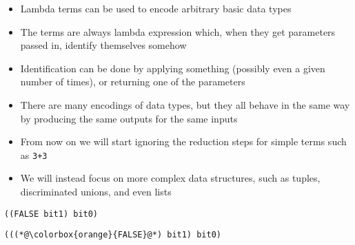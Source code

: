 \documentclass{beamer}
\begin{document}
\begin{frame}[fragile]{\CurrentSection}
\begin{block}{\CurrentSubSection}
\begin{itemize}
\item Lambda terms can be used to encode arbitrary basic data types
\item The terms are always lambda expression which, when they get parameters passed in, identify themselves somehow
\item Identification can be done by applying something (possibly even a given number of times), or returning one of the parameters

\end{itemize}

\end{block}


\end{frame}

\begin{frame}[fragile]{\CurrentSection}
\begin{block}{\CurrentSubSection}
\begin{itemize}
\item There are many encodings of data types, but they all behave in the same way by producing the same outputs for the same inputs
\item From now on we will start ignoring the reduction steps for simple terms such as \texttt{3+3}
\item We will instead focus on more complex data structures, such as tuples, discriminated unions, and even lists

\end{itemize}

\end{block}


\end{frame}

\begin{frame}[fragile]{\CurrentSection}
\lstset{basicstyle=\ttfamily\small}\lstset{numbers=none}\lstset{language=ML}\begin{lstlisting}
((FALSE bit1) bit0)
\end{lstlisting}
\pause\lstset{language=ML}\begin{lstlisting}
(((*@\colorbox{orange}{FALSE}@*) bit1) bit0)
\end{lstlisting}

\end{frame}
\end{document}
